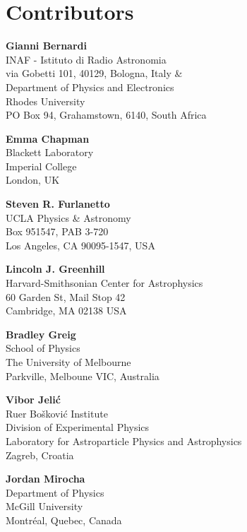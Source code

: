 
\chapter*{Contributors}



{\parskip=12pt


\noindent\textbf{Gianni Bernardi}\\
INAF - Istituto di Radio Astronomia\\
via Gobetti 101, 40129, Bologna, Italy \& \\
Department of Physics and Electronics\\
Rhodes University\\
PO Box 94, Grahamstown, 6140, South Africa


\noindent\textbf{Emma Chapman}\\
Blackett Laboratory\\
Imperial College\\
London, UK

\noindent\textbf{Steven R. Furlanetto}\\
UCLA Physics \& Astronomy\\
Box 951547, PAB 3-720\\
Los Angeles, CA 90095-1547, USA

\noindent\textbf{Lincoln J. Greenhill}\\
Harvard-Smithsonian Center for Astrophysics\\
60 Garden St, Mail Stop 42\\
Cambridge, MA 02138 USA

\noindent\textbf{Bradley Greig}\\
School of Physics\\
The University of Melbourne\\
Parkville, Melboune VIC, Australia

\noindent\textbf{Vibor Jeli\'c}\\
Ru{\dj}er Bo\v{s}kovi\'{c} Institute\\
Division of Experimental Physics\\
Laboratory for Astroparticle Physics and Astrophysics\\
Zagreb, Croatia

\noindent\textbf{Jordan Mirocha}\\
Department of Physics\\
McGill University \\
Montr\'eal, Quebec, Canada

}
